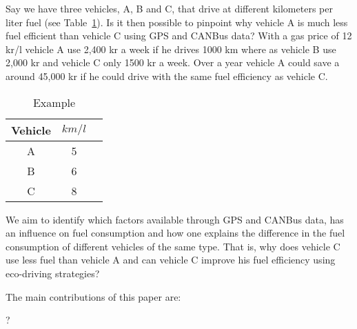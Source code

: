 Say we have three vehicles, A, B and C, that drive at different kilometers per liter fuel (see Table~\ref{tb:exemple1}).
Is it then possible to pinpoint why vehicle A is much less fuel efficient than vehicle C using GPS and CANBus data?
With a gas price of 12 kr/l vehicle A use 2,400 kr a week if he drives 1000 km where as vehicle B use 2,000 kr and vehicle C only 1500 kr a week. %
Over a year vehicle A could save a around 45,000 kr if he could drive with the same fuel efficiency as vehicle C.%
\begin{table}%
\centering
\begin{tabular}{|c|c|c|}\hline
Vehicle & $km/l$\\\hline
A & 5\\\hline
B & 6\\\hline
C & 8\\\hline
\end{tabular}
\caption{Example}\label{tb:exemple1}
\end{table}

We aim to identify which factors available through GPS and CANBus data, has an influence on fuel consumption and how one explains the difference in the fuel consumption of different vehicles of the same type.
That is, why does vehicle C use less fuel than vehicle A and can vehicle C improve his fuel efficiency using eco-driving strategies?


The main contributions of this paper are:
\begin{itemize*}
\item ?
\end{itemize*}